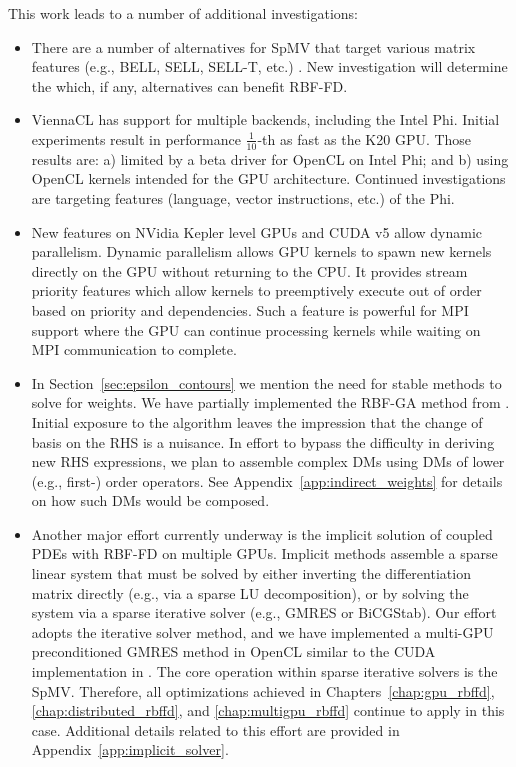 This work leads to a number of additional investigations:
\begin{itemize}
\item There are a number of alternatives for SpMV that target various matrix features (e.g., BELL, SELL, SELL-T, etc.) \cite{Kreutzer2012,SuKeutzer2012}. New investigation will determine the which, if any, alternatives can benefit RBF-FD. 

\item ViennaCL has support for multiple backends, including the Intel Phi. Initial experiments result in performance $\frac{1}{10}$-th as fast as the K20 GPU. Those results are: a) limited by a beta driver for OpenCL on Intel Phi; and b) using OpenCL kernels intended for the GPU architecture. Continued investigations are targeting features (language, vector instructions, etc.) of the Phi. 
\item 
New features on NVidia Kepler level GPUs and CUDA v5 allow dynamic parallelism. Dynamic parallelism allows GPU kernels to spawn new kernels directly on the GPU without returning to the CPU. It provides stream priority features which allow kernels to preemptively execute out of order based on priority and dependencies. Such a feature is powerful for MPI support where the GPU can continue processing kernels while waiting on MPI communication to complete. 
\item In Section~\ref{sec:epsilon_contours} we mention the need for stable methods to solve for weights. We have partially implemented the RBF-GA method from \cite{Fornberg2012}.  Initial exposure to the algorithm leaves the impression that the change of basis on the RHS is a nuisance. In effort to bypass the difficulty in deriving new RHS expressions, we plan to assemble complex DMs using DMs of lower (e.g., first-) order operators. See Appendix~\ref{app:indirect_weights} for details on how such DMs would be composed.
\item Another major effort currently underway is the implicit solution of coupled PDEs with RBF-FD on multiple GPUs. Implicit methods assemble a sparse linear system that must be solved by either inverting the differentiation matrix directly (e.g., via a sparse LU decomposition), or by solving the system via a sparse iterative solver (e.g., GMRES or BiCGStab).
Our effort adopts the iterative solver method, and we have implemented a multi-GPU preconditioned GMRES method in OpenCL similar to the CUDA implementation in \cite{Bahi2011}. The core operation within sparse iterative solvers is the SpMV. Therefore, all optimizations achieved in Chapters~\ref{chap:gpu_rbffd}, \ref{chap:distributed_rbffd}, and \ref{chap:multigpu_rbffd} continue to apply in this case. Additional details related to this effort are provided in Appendix~\ref{app:implicit_solver}.

\end{itemize}

